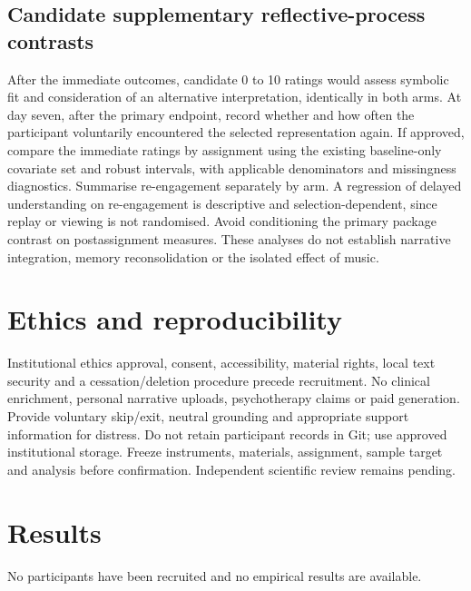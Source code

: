 \documentclass[11pt,a4paper]{article}
\begin{document}
\subsection{Candidate supplementary reflective-process contrasts}
After the immediate outcomes, candidate 0 to 10 ratings would assess symbolic fit and consideration of an alternative interpretation, identically in both arms. At day seven, after the primary endpoint, record whether and how often the participant voluntarily encountered the selected representation again. If approved, compare the immediate ratings by assignment using the existing baseline-only covariate set and robust intervals, with applicable denominators and missingness diagnostics. Summarise re-engagement separately by arm. A regression of delayed understanding on re-engagement is descriptive and selection-dependent, since replay or viewing is not randomised. Avoid conditioning the primary package contrast on postassignment measures. These analyses do not establish narrative integration, memory reconsolidation or the isolated effect of music.

\section{Ethics and reproducibility}
Institutional ethics approval, consent, accessibility, material rights, local text security and a cessation/deletion procedure precede recruitment. No clinical enrichment, personal narrative uploads, psychotherapy claims or paid generation. Provide voluntary skip/exit, neutral grounding and appropriate support information for distress. Do not retain participant records in Git; use approved institutional storage. Freeze instruments, materials, assignment, sample target and analysis before confirmation. Independent scientific review remains pending.
\section{Results}
No participants have been recruited and no empirical results are available.
\end{document}
